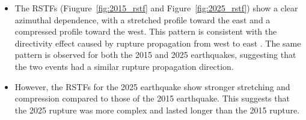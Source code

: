 \begin{itemize}
     for the finite-fault inversion.
    \item The RSTFs (Fiugure~\ref{fig:2015_rstf} and Figure~\ref{fig:2025_rstf}) show a clear azimuthal dependence, with a stretched profile toward the east 
    and a compressed profile toward
     the west. This pattern is consistent with the directivity effect caused by rupture propagation from west to east
      \cite{Aderhold2016}. The same pattern is observed for both the 2015 and 2025 earthquakes, suggesting that the two events
       had a similar rupture propagation direction.
    \item However, the RSTFs for the 2025 earthquake show stronger stretching and compression compared to those of the 2015 earthquake.
     This suggests that the 2025 rupture was more complex and lasted longer than the 2015 rupture.


        


\end{itemize}
